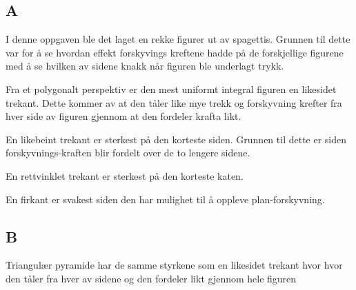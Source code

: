\documentclass{report}
\begin{document}
\subsection{A}

I denne oppgaven ble det laget en rekke figurer ut av spagettis. Grunnen til dette var for å se hvordan effekt forskyvings kreftene hadde på de forskjellige figurene med å se hvilken av sidene knakk når figuren ble underlagt trykk.

Fra et polygonalt perspektiv er den mest uniformt integral figuren en likesidet trekant. Dette kommer av at den tåler like mye trekk og forskyvning krefter fra hver side av figuren gjennom at den fordeler krafta likt.

En likebeint trekant er sterkest på den korteste siden. Grunnen til dette er siden forskyvnings-kraften blir fordelt over de to lengere sidene.

En rettvinklet trekant er sterkest på den korteste katen.

En firkant er svakest siden den har mulighet til å oppleve plan-forskyvning.

\subsection{B}

Triangulær pyramide har de samme styrkene som en likesidet trekant hvor hvor den tåler fra hver av sidene og den fordeler likt gjennom hele figuren
\end{document}
